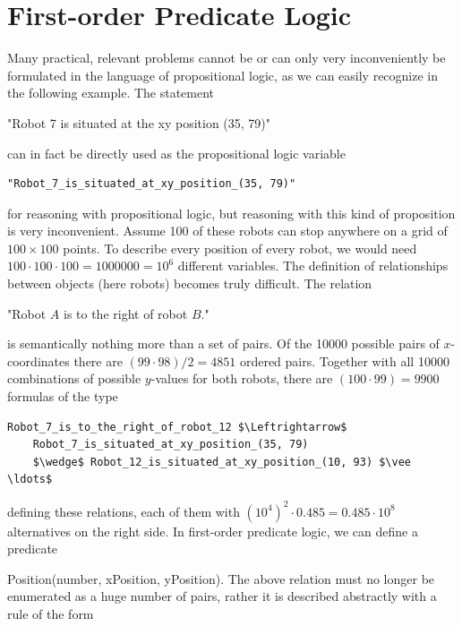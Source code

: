\documentclass[10pt]{book}
\begin{document}
\section{First-order Predicate Logic}
Many practical, relevant problems cannot be or can only very inconveniently be formulated in the language of propositional logic, as we can easily recognize in the following example. The statement
\begin{displayquote}
"Robot 7 is situated at the xy position (35, 79)"
\end{displayquote}

can in fact be directly used as the propositional logic variable

\begin{verbatim}
"Robot_7_is_situated_at_xy_position_(35, 79)"
\end{verbatim}

for reasoning with propositional logic, but reasoning with this kind of proposition is very inconvenient. Assume 100 of these robots can stop anywhere on a grid of $100 \times 100$ points. To describe every position of every robot, we would need $100 \cdot 100 \cdot 100=1000000=10^{6}$ different variables. The definition of relationships between objects (here robots) becomes truly difficult. The relation

\begin{displayquote}
"Robot $A$ is to the right of robot $B$."
\end{displayquote}

is semantically nothing more than a set of pairs. Of the 10000 possible pairs of $x$-coordinates there are $(99 \cdot 98) / 2=4851$ ordered pairs. Together with all 10000 combinations of possible $y$-values for both robots, there are $(100 \cdot 99)=9900$ formulas of the type

\begin{verbatim}
Robot_7_is_to_the_right_of_robot_12 $\Leftrightarrow$
    Robot_7_is_situated_at_xy_position_(35, 79)
    $\wedge$ Robot_12_is_situated_at_xy_position_(10, 93) $\vee \ldots$
\end{verbatim}

defining these relations, each of them with $\left(10^{4}\right)^{2} \cdot 0.485=0.485 \cdot 10^{8}$ alternatives on the right side. In first-order predicate logic, we can define a predicate

Position(number, xPosition, yPosition). The above relation must no longer be enumerated as a huge number of pairs, rather it is described abstractly with a rule of the form
\end{document}
